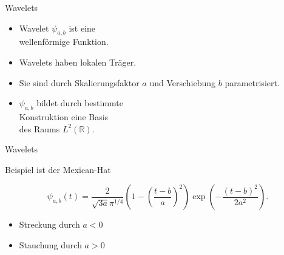 \documentclass[aspectratio=169, 12pt]{beamer}
\begin{document}
\begin{frame}{Wavelets}
  \begin{figure}
    \vspace{-1.2cm}
  \end{figure}
  \leavevmode
  \vspace{-1.0cm}
  \begin{itemize}
    \item Wavelet $\psi_{a,b}$ ist eine \\ wellenförmige Funktion.
    \item Wavelets haben lokalen Träger.
    \item Sie sind durch Skalierungsfaktor $a$ und Verschiebung $b$ parametrisiert.
    \item $\psi_{a,b}$ bildet durch bestimmte \\ Konstruktion eine Basis \\ des Raums $L^2(\mathbb{R})$.
  \end{itemize}
\end{frame}

\begin{frame}{Wavelets}
  \begin{figure}
    \vspace{-1.4cm}
  \end{figure}
  \leavevmode
  \vspace{-1.0cm}
  Beispiel ist der Mexican-Hat
  \vspace{1.2cm}
  \begin{small}
    \begin{equation*}
      \psi_{a,b}(t) = \frac{2}{\sqrt{3a}\pi^{1/4}} \left( 1- \left( \frac{t-b}{a} \right)^2 \right) \exp \left( - \frac{\left( t-b \right)^2}{2a^2} \right).
    \end{equation*}
  \end{small}
  \begin{itemize}
    \item Streckung durch $a<0$
    \item Stauchung durch $a>0$
  \end{itemize}
\end{frame}
\end{document}
